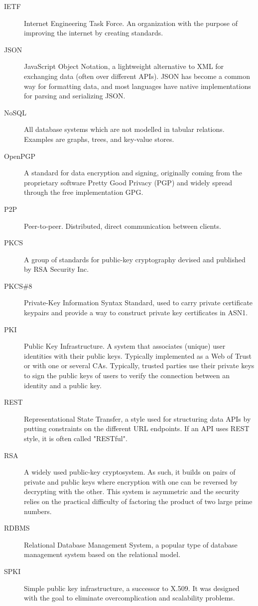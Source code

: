 \begin{description}
  \item[IETF] Internet Engineering Task Force. An organization with the purpose of improving the internet by creating standards. 
  \item[JSON] JavaScript Object Notation, a lightweight alternative to XML for exchanging data (often over different APIs). JSON has become a common way for formatting data, and most languages have native implementations for parsing and serializing JSON.
  \item[NoSQL] All database systems which are not modelled in tabular relations. Examples are graphs, trees, and key-value stores.
  \item[OpenPGP] A standard for data encryption and signing, originally coming from the proprietary software Pretty Good Privacy (PGP) and widely spread through the free implementation GPG.
  \item[P2P] Peer-to-peer. Distributed, direct communication between clients.
  \item[PKCS] A group of standards for public-key cryptography devised and published by RSA Security Inc.
  \item[PKCS\#8] Private-Key Information Syntax Standard, used to carry private certificate keypairs and provide a way to construct private key certificates in ASN1.
  \item[PKI] Public Key Infrastructure. A system that associates (unique) user identities with their public keys. Typically implemented as a Web of Trust or with one or several CAs. Typically, trusted parties use their private keys to sign the public keys of users to verify the connection between an identity and a public key.
  \item[REST] Representational State Transfer, a style used for structuring data APIs by putting constraints on the different URL endpoints. If an API uses REST style, it is often called "RESTful".
  \item[RSA] A widely used public-key cryptosystem. As such, it builds on pairs of private and public keys where encryption with one can be reversed by decrypting with the other. This system is asymmetric and the security relies on the practical difficulty of factoring the product of two large prime numbers.
  \item[RDBMS] Relational Database Management System, a popular type of database management system based on the relational model.
  \item[SPKI] Simple public key infrastructure, a successor to X.509. It was designed with the goal to eliminate overcomplication and scalability problems.

\end{description}
